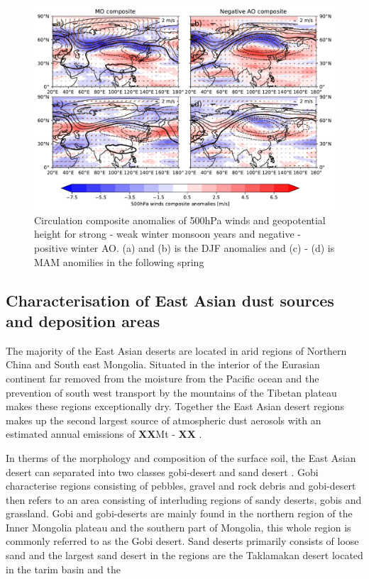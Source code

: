 \begin{figure}[htbp]
    \centering
    \includegraphics[width=\textwidth]{texfiles/figs/winter_MO_AO_composite_500h.pdf}
    \caption{Circulation composite anomalies of 500hPa winds and geopotential height for strong - weak winter monsoon years and negative - positive winter AO. (a) and (b) is the DJF anomalies and (c) - (d) is MAM anomilies in the following spring}
    \label{fig:mo_ao_composite_500hPa}
\end{figure}

\subsection{Characterisation of East Asian dust sources and deposition areas}
The majority of the East Asian deserts are located in arid regions of Northern China and South east Mongolia. Situated in the interior of the Eurasian continent far removed from the moisture from the Pacific ocean and the prevention of south west transport by the mountains of the Tibetan plateau makes these regions exceptionally dry.  Together the East Asian desert regions makes up the second largest source of atmospheric dust aerosols \parencite{chen2017overview} with an estimated annual emissions of \textbf{XX}Mt - \textbf{XX} . 


In therms of the morphology and composition of the surface soil, the East Asian desert can separated into two classes gobi-desert and sand desert \parencite{xuan2002characterization}. Gobi characterise regions consisting of pebbles, gravel and rock debris and gobi-desert then refers to an area consisting of interluding regions of sandy deserts, gobis and grassland. Gobi and gobi-deserts are mainly found in the northern region of the Inner Mongolia plateau and the southern part of Mongolia, this whole region is commonly referred to as the Gobi desert. Sand deserts primarily consists of loose sand and the largest sand desert in the regions are the Taklamakan desert located in the tarim basin and the    



